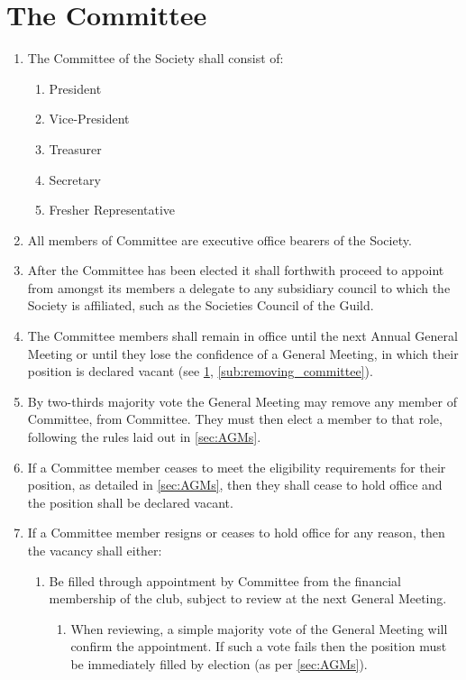 \documentclass[a4paper]{article}
\begin{document}
\section{The Committee} \label{sec:committee}
\begin{enumerate}
	\item The Committee of the Society shall consist of:
    \begin{enumerate}
        \item President
        \item Vice-President
        \item Treasurer
        \item Secretary
        \item Fresher Representative
    \end{enumerate}
    \item All members of Committee are executive office bearers of the Society.
    \item After the Committee has been elected it shall forthwith proceed to appoint from amongst its members a delegate to any subsidiary council to which the Society is affiliated, such as the Societies Council of the Guild.
    \item The Committee members shall remain in office until the next Annual General Meeting or until they lose the confidence of a General Meeting, in which their position is declared vacant (see \cref{sec:committee}, \cref{sub:removing_committee}).
    \item \label{sub:removing_committee} By two-thirds majority vote the General Meeting may remove any member of Committee, from Committee. They must then elect a member to that role, following the rules laid out in \cref{sec:AGMs}.
    \item If a Committee member ceases to meet the eligibility requirements for their position, as detailed in \cref{sec:AGMs}, then they shall cease to hold office and the position shall be declared vacant.
    \item \label{sub:committee_resign} If a Committee member resigns or ceases to hold office for any reason, then the vacancy shall either:
    \begin{enumerate}
        \item Be filled through appointment by Committee from the financial membership of the club, subject to review at the next General Meeting.
        \begin{enumerate}
            \item When reviewing, a simple majority vote of the General Meeting will confirm the appointment. If such a vote fails then the position must be immediately filled by election (as per \cref{sec:AGMs}).

\end{enumerate}
\end{enumerate}
\end{enumerate}
\end{document}
